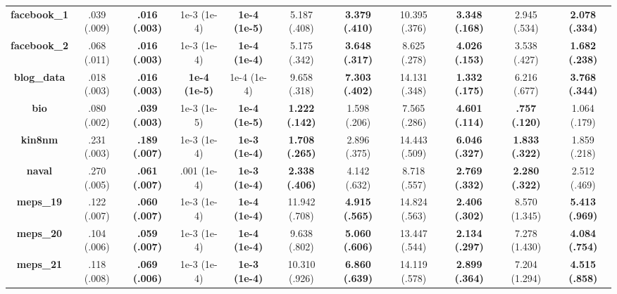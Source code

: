 \documentclass{article}
\begin{document}
\begin{appendices}
\begin{table}[htbp]
{\begin{tabular}{ccccccccccc}
    \textbf{facebook\_1} &    .039 (.009) &  \textbf{.016 (.003)} &           1e-3 (1e-4) &  \textbf{1e-4 (1e-5)} &           5.187 (.408) &  \textbf{3.379 (.410)} &      10.395 (.376) &  \textbf{3.348 (.168)} &           2.945 (.534) &  \textbf{2.078 (.334)} \\
    \textbf{facebook\_2} &    .068 (.011) &  \textbf{.016 (.003)} &           1e-3 (1e-4) &  \textbf{1e-4 (1e-4)} &           5.175 (.342) &  \textbf{3.648 (.317)} &       8.625 (.278) &  \textbf{4.026 (.153)} &           3.538 (.427) &  \textbf{1.682 (.238)} \\
    \textbf{blog\_data}  &    .018 (.003) &  \textbf{.016 (.003)} &  \textbf{1e-4 (1e-5)} &           1e-4 (1e-4) &           9.658 (.318) &  \textbf{7.303 (.402)} &      14.131 (.348) &  \textbf{1.332 (.175)} &           6.216 (.677) &  \textbf{3.768 (.344)} \\
    \textbf{bio}        &    .080 (.002) &  \textbf{.039 (.003)} &           1e-3 (1e-5) &  \textbf{1e-4 (1e-5)} &  \textbf{1.222 (.142)} &           1.598 (.206) &       7.565 (.286) &  \textbf{4.601 (.114)} &   \textbf{.757 (.120)} &           1.064 (.179) \\
    \textbf{kin8nm}     &    .231 (.003) &  \textbf{.189 (.007)} &           1e-3 (1e-4) &  \textbf{1e-3 (1e-4)} &  \textbf{1.708 (.265)} &           2.896 (.375) &      14.443 (.509) &  \textbf{6.046 (.327)} &  \textbf{1.833 (.322)} &           1.859 (.218) \\
    \textbf{naval}      &    .270 (.005) &  \textbf{.061 (.007)} &           .001 (1e-4) &  \textbf{1e-3 (1e-4)} &  \textbf{2.338 (.406)} &           4.142 (.632) &       8.718 (.557) &  \textbf{2.769 (.332)} &  \textbf{2.280 (.322)} &           2.512 (.469) \\
    \textbf{meps\_19}    &    .122 (.007) &  \textbf{.060 (.007)} &           1e-3 (1e-4) &  \textbf{1e-4 (1e-4)} &          11.942 (.708) &  \textbf{4.915 (.565)} &      14.824 (.563) &  \textbf{2.406 (.302)} &          8.570 (1.345) &  \textbf{5.413 (.969)} \\
    \textbf{meps\_20}    &    .104 (.006) &  \textbf{.059 (.007)} &           1e-3 (1e-4) &  \textbf{1e-4 (1e-4)} &           9.638 (.802) &  \textbf{5.060 (.606)} &      13.447 (.544) &  \textbf{2.134 (.297)} &          7.278 (1.430) &  \textbf{4.084 (.754)} \\
    \textbf{meps\_21}    &    .118 (.008) &  \textbf{.069 (.006)} &           1e-3 (1e-4) &  \textbf{1e-3 (1e-4)} &          10.310 (.926) &  \textbf{6.860 (.639)} &      14.119 (.578) &  \textbf{2.899 (.364)} &          7.204 (1.294) &  \textbf{4.515 (.858)} \\
    
    \bottomrule[1.1pt]
    
    \end{tabular}%
    }
  \label{tab:real_cqr_std_errs}%
\end{table}%

\end{appendices}
\end{document}
